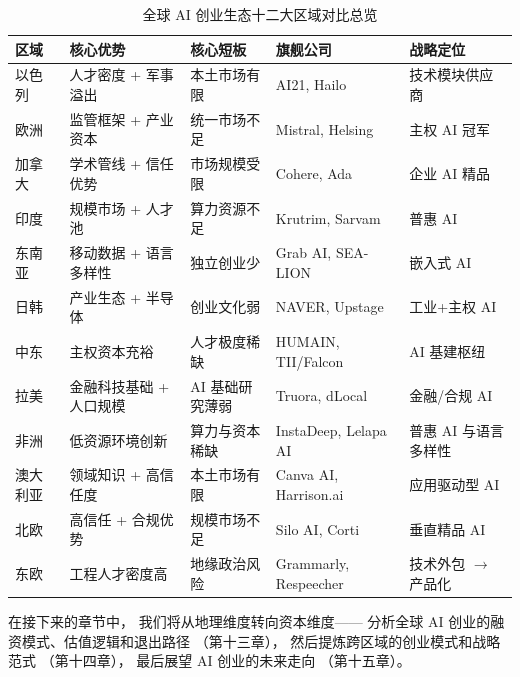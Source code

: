 \begin{table}[htbp]
\centering
\caption{全球 AI 创业生态十二大区域对比总览}
\label{tab:global-ai-comparison}
\small
\begin{tabularx}{\textwidth}{l l l l X}
\toprule
\rowcolor{figLightGray}
\textbf{区域} & \textbf{核心优势} & \textbf{核心短板} & \textbf{旗舰公司} & \textbf{战略定位} \\
\midrule
以色列 & 人才密度 + 军事溢出
       & 本土市场有限
       & AI21, Hailo
       & 技术模块供应商 \\
欧洲   & 监管框架 + 产业资本
       & 统一市场不足
       & Mistral, Helsing
       & 主权 AI 冠军 \\
加拿大 & 学术管线 + 信任优势
       & 市场规模受限
       & Cohere, Ada
       & 企业 AI 精品 \\
印度   & 规模市场 + 人才池
       & 算力资源不足
       & Krutrim, Sarvam
       & 普惠 AI \\
东南亚 & 移动数据 + 语言多样性
       & 独立创业少
       & Grab AI, SEA-LION
       & 嵌入式 AI \\
日韩   & 产业生态 + 半导体
       & 创业文化弱
       & NAVER, Upstage
       & 工业+主权 AI \\
中东   & 主权资本充裕
       & 人才极度稀缺
       & HUMAIN, TII/Falcon
       & AI 基建枢纽 \\
拉美   & 金融科技基础 + 人口规模
       & AI 基础研究薄弱
       & Truora, dLocal
       & 金融/合规 AI \\
非洲   & 低资源环境创新
       & 算力与资本稀缺
       & InstaDeep, Lelapa AI
       & 普惠 AI 与语言多样性 \\
澳大利亚 & 领域知识 + 高信任度
       & 本土市场有限
       & Canva AI, Harrison.ai
       & 应用驱动型 AI \\
北欧   & 高信任 + 合规优势
       & 规模市场不足
       & Silo AI, Corti
       & 垂直精品 AI \\
东欧   & 工程人才密度高
       & 地缘政治风险
       & Grammarly, Respeecher
       & 技术外包 $\to$ 产品化 \\
\bottomrule
\end{tabularx}
\end{table}

在接下来的章节中，
我们将从地理维度转向资本维度——
分析全球 AI 创业的融资模式、估值逻辑和退出路径
（第十三章），
然后提炼跨区域的创业模式和战略范式
（第十四章），
最后展望 AI 创业的未来走向
（第十五章）。
